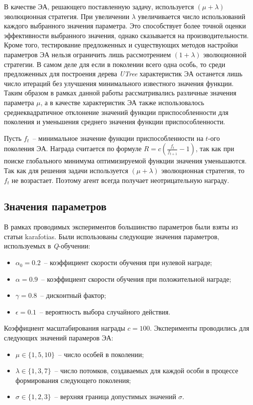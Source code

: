 В качестве ЭА, решающего поставленную задачу, используется $(\mu + \lambda)$ эволюционная стратегия. При увеличении $\lambda$ увеличивается число использований каждого выбранного значения параметра. Это способствует более точной оценки эффективности выбранного значения, однако сказывается на производительности. Кроме того, тестирование предложенных и существующих методов настройки параметров ЭА нельзя ограничить лишь рассмотрением $(1+\lambda)$ эволюционной стратегии. В самом деле для если в поколении всего одна особь, то среди предложенных для построения дерева \textit{UTree} характеристик ЭА останется лишь число итераций без улучшения минимального известного значения функции. Таким образом в рамках данной работы рассматривались различные значения параметра $\mu$, а в качестве характеристик ЭА также использовалось среднеквадратичное отклонение значений функции приспособленности для поколения и уменьшения среднего значения функции приспособленности.

Пусть $f_t$~-- минимальное значение функции приспособленности на $t$-ого поколения ЭА. Награда считается по формуле $R = c(\frac{f_t}{f_{t + 1}} - 1)$, так как при поиске глобального минимума оптимизируемой функции значения уменьшаются. Так как для решения задачи используется $(\mu + \lambda)$ эволюционная стратегия, то $f_t$ не возрастает. Поэтому агент всегда получает неотрицательную награду.

\subsection{Значения параметров}

В рамках проводимых экспериментов большинство параметров были взяты из статьи {karafotias}. Были использованы следующие значения параметров, используемых в \textit{Q}-обучении:
\begin{itemize}
 \item $\alpha_0 = 0.2$~-- коэффициент скорости обучения при нулевой награде;
 \item $\alpha = 0.9$~-- коэффициент скорости обучения при положительной награде;
 \item $\gamma = 0.8$~-- дисконтный фактор;
 \item $\epsilon = 0.1$~-- вероятность выбора случайного действия.
\end{itemize}

Коэффициент масштабирования награды $c = 100$. Эксперименты проводились для следующих значений парамеров ЭА:
\begin{itemize}
 \item $\mu \in \{1, 5, 10\}$~-- число особей в поколении;
 \item $\lambda \in \{1, 3, 7\}$~-- число потомков, создаваемых для каждой особи в процессе формирования следующего поколения;
 \item $\sigma \in \{1, 2, 3\}$~-- верхняя граница допустимых значений $\sigma$.
\end{itemize}

